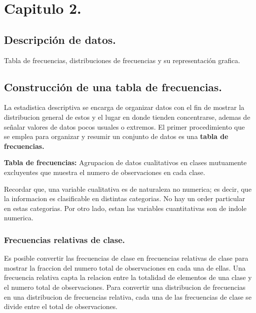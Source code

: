 \documentclass[]{article}
\begin{document}
\section{Capitulo 2.}
\subsection{Descripción de datos.}
{\large Tabla de frecuencias, distribuciones de frecuencias y su representación grafica.}
\subsection{Construcción de una tabla de frecuencias.}
La estadistica descriptiva se encarga de organizar datos con el fin de mostrar la distribucion general de estos y el lugar en donde tienden concentrarse, ademas de señalar valores de datos pocos usuales o extremos. El primer procedimiento que se emplea para organizar y resumir un conjunto de datos es una \textbf{tabla de frecuencias.}
\begin{center}
	\textbf{Tabla de frecuencias:} Agrupacion de datos cualitativos en clases mutuamente excluyentes que muestra el numero de observaciones en cada clase.
\end{center}
Recordar que, una variable cualitativa es de naturaleza no numerica; es decir, que la informacion es clasificable en distintas categorias. No hay un order particular en estas categorias. Por otro lado, estan las variables cuantitativas son de indole numerica.
\subsubsection*{Frecuencias relativas de clase.}
Es posible convertir las frecuencias de clase en frecuencias relativas de clase para mostrar la fraccion del numero total de observaciones en cada una de ellas. Una frecuencia relativa capta la relacion entre la totalidad de elementos de una clase y el numero total de observaciones. Para convertir una distribucion de frecuencias en una distribucion de frecuencias relativa, cada una de las frecuencias de clase se divide entre el total de observaciones.
\end{document}
